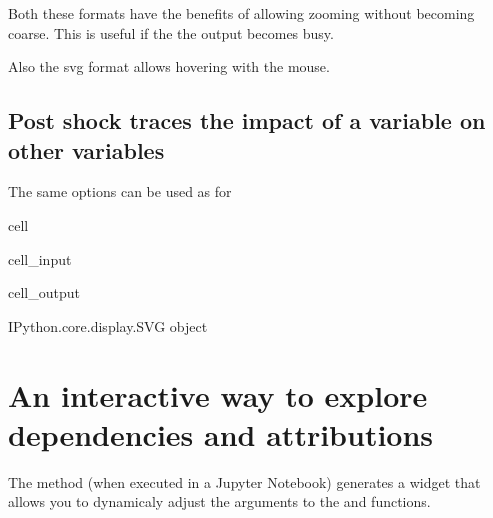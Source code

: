 \documentclass[letterpaper,10pt,english]{jupyterBook}
\begin{document}
\sphinxAtStartPar
Both these formats have the benefits of allowing zooming without becoming coarse. This is useful if the the output
becomes busy.

\sphinxAtStartPar
Also the svg format allows hovering with the mouse.


\section{Post shock  traces the impact of a variable on other variables}
\label{\detokenize{content/06_ModelAnalytics/ModelStructure:post-shock-tracedep-traces-the-impact-of-a-variable-on-other-variables}}
\sphinxAtStartPar
The same options can be used as for 

\begin{sphinxuseclass}{cell}\begin{sphinxVerbatimInput}

\begin{sphinxuseclass}{cell_input}
\begin{sphinxVerbatim}[commandchars=\\\{\}]
\end{sphinxVerbatim}

\end{sphinxuseclass}\end{sphinxVerbatimInput}
\begin{sphinxVerbatimOutput}

\begin{sphinxuseclass}{cell_output}
\begin{sphinxVerbatim}[commandchars=\\\{\}]
\PYGZlt{}IPython.core.display.SVG object\PYGZgt{}
\end{sphinxVerbatim}

\end{sphinxuseclass}\end{sphinxVerbatimOutput}

\end{sphinxuseclass}

\chapter{ An interactive way to explore dependencies and attributions}
\label{\detokenize{content/06_ModelAnalytics/ModelStructure:modeldash-an-interactive-way-to-explore-dependencies-and-attributions}}
\sphinxAtStartPar
The  method (when executed in a Jupyter Notebook) generates a widget that allows you to dynamicaly adjust the arguments to the  and  functions.
\end{document}
